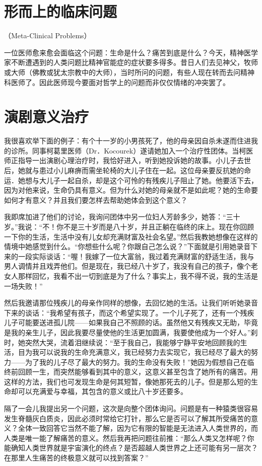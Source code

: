 \documentclass[11pt,oneside]{book}
\begin{document}
\begin{common-format}
\section{形而上的临床问题}
（Meta-Clinical Problems）

一位医师愈来愈会面临这个问题：生命是什么？痛苦到底是什么？今天，精神医学家不断遭遇到的人类问题比精神官能症的症状要多得多。昔日人们去见神父，牧师或大师（佛教或犹太宗教中的大师），当时所问的问题，有些人现在转而去问精神科医师了。因此医师现今要面对哲学上的问题而非仅仅情绪的冲突罢了。

\section{演剧意义治疗}
我很喜欢举下面的例子：有个十一岁的小男孩死了，他的母亲因自杀未遂而住进我的诊所。同事柯葛里医师（Dr．Kocourek）遂请她加入一个治疗性团体。当柯医师正指导一出演剧心理治疗时，我恰好进入，听到她投诉她的故事。小儿子去世后，她就与患过小儿麻痹而需坐轮椅的大儿子住在一起。这位母亲要反抗她的命运．她想与大儿子一起自杀，却是这个可怜的有残疾儿子阻止了她。他要活下去，因为对他来说，生命仍具有意义。但为什么对她的母亲就不是如此呢？她的生命要如何才有意义？并且我们要怎样去帮助她体会到这个意义？

我即席加进了他们的讨论，我询问团体中另一位妇人芳龄多少，她答：“三十岁。”我说：“不！你不是三十岁而是八十岁，并且正躺在临终的床上。现在你回顾一下你的生活，生活中没有儿女却充满财富及社会名望。”然后我教她想像在这样的情境中她感觉到什么。“你想些什么呢？你跟自己怎么说？”下面就是引用她录音下来的一段实际谈话：“喔！我嫁了一位大富翁，我过着充满财富的舒适生活，我与男人调情并且戏弄他们。但是现在，我已经八十岁了，我没有自己的孩子，像个老女人那样回忆，我看不出一切到底是为了什么？事实上，我不得不说，我的生活是一场失败！”

然后我邀请那位残疾儿的母亲作同样的想像，去回忆她的生活。让我们听听她录音下来的谈话：“我希望有孩子，而这个希望实现了。一个儿子死了，还有一个残疾儿子可能要送进孤儿院——如果我自己不照顾的话。虽然他又有残疾又无助，毕竟是我的亲生儿子，因此我要尽量使他的生活更加圆满，我要使他成为一个好人。”刹时，她突然大哭，流着泪继续说：“至于我自己，我能够宁静平安地回顾我的生活，目为我可以说我的生命充满意义，我已经努力去实现它，我已经尽了最大的努力——为了我的儿子尽了最大的努力。我的生命没有失败！”她因为假想自己在临终前回顾一生，而突然能够看到其中的意义，这意义甚至包含了她所有的痛苦。用这样的方法，我们也可发现生命是何其短暂，像她那死去的儿子。但是那么短的生命却可以充满爱与幸福，其包含的意义或比八十岁还要多。

隔了一会儿我提出另一个问题，这次是向整个团体询问。问题是有一种猿类很容易发生脊髓灰白质炎，因此必须时常给它打针，那么它是否可以了解其所受痛苦的意义？全体一致回答它当然不能了解，因为它有限的智能是无法进入人类世界的，而人类是唯一能了解痛苦的意义。然后我再把问题往前推：“那么人类又怎样呢？你能确知人类世界就是宇宙演化的终点？是否超越人类世界之上还可能有另一层次？在那里人生痛苦的终极意义就可以找到答案？”



\end{common-format}
\end{document}
